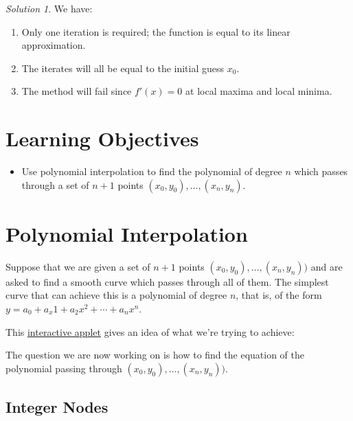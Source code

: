 \documentclass[
]{book}
\providecommand{\tightlist}{%
  \setlength{\itemsep}{0pt}\setlength{\parskip}{0pt}}
\theoremstyle{definition}
\theoremstyle{definition}
\theoremstyle{definition}
\theoremstyle{definition}
\theoremstyle{remark}
\newtheorem*{solution}{Solution}
\begin{document}
\begin{solution}

We have:

\begin{enumerate}
\def\labelenumi{\alph{enumi}.}
\tightlist
\item
  Only one iteration is required; the function is equal to its linear approximation.
\item
  The iterates will all be equal to the initial guess \(x_0\).
\item
  The method will fail since \(f'(x)=0\) at local maxima and local minima.
\end{enumerate}

\end{solution}

\hypertarget{learning-objectives-18}{%
\section{Learning Objectives}\label{learning-objectives-18}}

\begin{itemize}
\tightlist
\item
  Use polynomial interpolation to find the polynomial of degree \(n\) which passes through a set of \(n+1\) points \((x_0,y_0), \ldots, (x_n,y_n)\).
\end{itemize}

\hypertarget{polynomial-interpolation}{%
\section{Polynomial Interpolation}\label{polynomial-interpolation}}

Suppose that we are given a set of \(n+1\) points \((x_0,y_0), \ldots, (x_n,y_n))\) and are asked to find a smooth curve which passes through all of them. The simplest curve that can achieve this is a polynomial of degree \(n\), that is, of the form \(y=a_0+a_x1+a_2x^2+\cdots+a_nx^n\).

This \href{https://www.geogebra.org/m/r4jkx4jh}{interactive applet} gives an idea of what we're trying to achieve:

The question we are now working on is how to find the equation of the polynomial passing through \((x_0,y_0), \ldots, (x_n,y_n))\).

\hypertarget{integer-nodes}{%
\subsection{Integer Nodes}\label{integer-nodes}}
\end{document}
